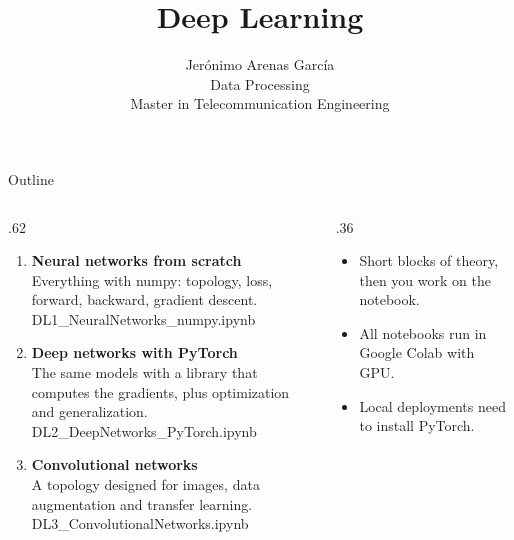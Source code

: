 \documentclass[aspectratio=169,10pt]{beamer}
\title{Deep Learning}
\author{Jerónimo Arenas García \\ Data Processing \\ Master in Telecommunication Engineering}
\institute{Universidad Carlos III de Madrid}
\date{}
\begin{document}
{
\maketitle}

\begin{frame}[t]{Outline}
\begin{columns}[T]
\begin{column}{.62\textwidth}
\begin{enumerate}
  \item \textbf{Neural networks from scratch}\\
        {\small Everything with numpy: topology, loss, forward, \alert{backward},
         gradient descent.}\\[.2em]
        {\footnotesize\ttfamily DL1\_NeuralNetworks\_numpy.ipynb}
  \item \textbf{Deep networks with PyTorch}\\
        {\small The same models with a library that computes the gradients,
         plus optimization and generalization.}\\[.2em]
        {\footnotesize\ttfamily DL2\_DeepNetworks\_PyTorch.ipynb}
  \item \textbf{Convolutional networks}\\
        {\small A topology designed for images, data augmentation and
         transfer learning.}\\[.2em]
        {\footnotesize\ttfamily DL3\_ConvolutionalNetworks.ipynb}
\end{enumerate}
\vspace{-.6em}
\end{column}
\begin{column}{.36\textwidth}
\begin{keybox}
\small
\begin{itemize}
    \item Short blocks of theory, then you work on the notebook.
    \item All notebooks run in Google Colab with GPU.
    \item Local deployments need to install PyTorch.
\end{itemize}

\end{keybox}
\end{column}
\end{columns}
\end{frame}
\end{document}
